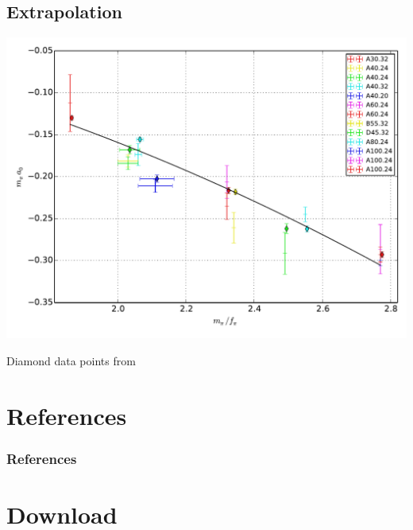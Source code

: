 \documentclass[english, fleqn]{beamer}
\begin{document}
\subsection*{Extrapolation}

\begin{frame}
    \begin{center}
        \includegraphics[height=.9\textheight]{plots/result.pdf}
    \end{center}

    Diamond data points from \parencite{Knippschild/Pi_Pi_Scattering}
\end{frame}


\section*{References}

\begin{frame}
    \frametitle{References}

    \printbibliography
\end{frame}

\section*{Download}
\end{document}
